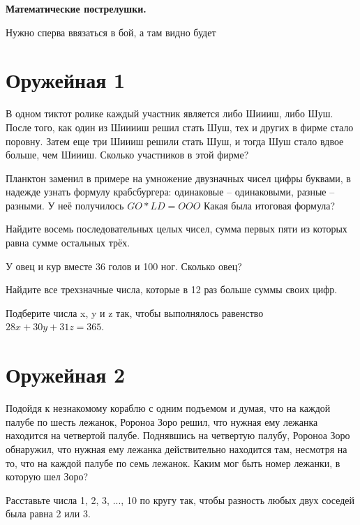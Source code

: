 \centerline{\bf \Huge Математические пострелушки.}

\begin{flushright}
        \scriptsize{Нужно сперва ввязаться в бой, а там видно будет}
\end{flushright}


\section{Оружейная 1}

 В одном тиктот ролике каждый участник является либо Шиииш, либо Шуш. После того, как один из Шииииш решил стать Шуш, тех и других в фирме стало поровну. Затем еще три Шиииш решили стать Шуш, и тогда Шуш стало вдвое больше, чем Шиииш. Сколько участников в этой фирме?

Планктон заменил в примере на умножение двузначных чисел цифры буквами, в надежде узнать формулу крабсбургера: одинаковые – одинаковыми, разные – разными. У неё получилось $GO * LD = OOO$ Какая была итоговая формула?

Найдите восемь последовательных целых чисел, сумма первых пяти из которых равна сумме остальных трёх.

 У овец и кур вместе 36 голов и 100 ног. Сколько овец? 

 Найдите все трехзначные числа, которые в 12 раз больше суммы своих цифр.

 Подберите числа x, y и z так, чтобы выполнялось равенство $28x + 30y + 31z = 365.$




\newpage

\section{Оружейная 2}

 Подойдя к незнакомому  кораблю с одним подъемом и думая, что на каждой палубе по шесть лежанок, Ророноа Зоро решил, что нужная ему лежанка находится на четвертой палубе. Поднявшись на четвертую палубу, Ророноа Зоро обнаружил, что нужная ему лежанка действительно находится там, несмотря на то, что на каждой палубе по семь лежанок. Каким мог быть номер лежанки, в которую шел Зоро?


Расставьте числа 1, 2, 3, ..., 10 по кругу так, чтобы разность любых двух соседей была равна 2 или 3.



